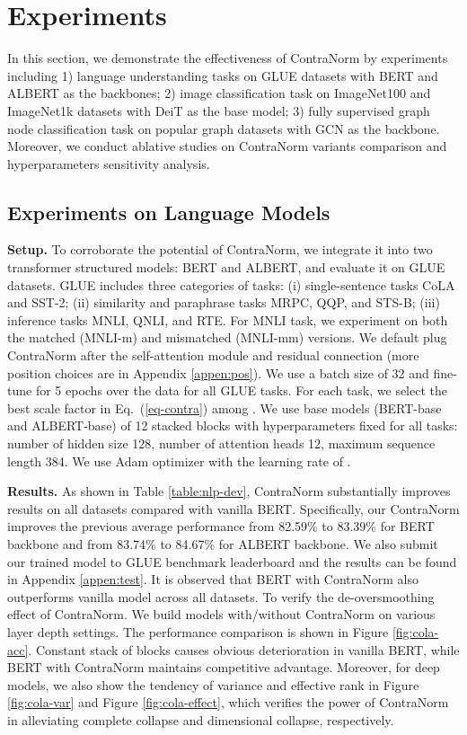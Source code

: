 \documentclass{article}
\theoremstyle{definition}
\theoremstyle{remark}
\theoremstyle{theorem}
\begin{document}
\section{Experiments}
In this section, we demonstrate the effectiveness of ContraNorm by experiments including 1) language understanding tasks on GLUE datasets with BERT and ALBERT \citep{lan2019albert} as the backbones; 2) image classification task on ImageNet100 and ImageNet1k datasets with DeiT as the base model; 3) fully supervised graph node classification task on popular graph datasets with GCN as the backbone. Moreover, we conduct ablative studies on ContraNorm variants comparison and hyperparameters sensitivity analysis.


\subsection{Experiments on Language Models} \label{sec:nlp-task}
\textbf{Setup.} 
To corroborate the potential of ContraNorm, we integrate it into two transformer structured models: BERT and ALBERT, and evaluate it on GLUE datasets. GLUE includes three categories of tasks:  (i) single-sentence tasks CoLA and SST-2; (ii) similarity and paraphrase tasks MRPC, QQP, and STS-B; (iii) inference tasks MNLI, QNLI, and RTE. For MNLI task, we experiment on both the matched (MNLI-m) and mismatched (MNLI-mm) versions. We default plug ContraNorm after the self-attention module and residual connection (more position choices are in Appendix \ref{appen:pos}). We use a batch size of 32 and fine-tune for 5 epochs over the data for all GLUE tasks. For each task, we select the best scale factor  in Eq.~(\ref{eq-contra}) among . We use base models (BERT-base and ALBERT-base) of 12 stacked blocks with hyperparameters fixed for all tasks: number of hidden size 128, number of attention heads 12, maximum sequence length 384. We use Adam \citep{kingma2014adam} optimizer with the learning rate of . 

\textbf{Results.} As shown in Table \ref{table:nlp-dev}, ContraNorm substantially improves results on all datasets compared with vanilla BERT. Specifically, our ContraNorm improves the previous average performance from 82.59\% to 83.39\% for BERT backbone and from 83.74\% to 84.67\% for ALBERT backbone. We also submit our trained model to GLUE benchmark leaderboard and the results can be found in Appendix \ref{appen:test}. It is observed that BERT with ContraNorm also outperforms vanilla model across all datasets. To verify the de-oversmoothing effect of ContraNorm. We build models with/without ContraNorm on various layer depth settings. The performance comparison is shown in Figure \ref{fig:cola-acc}. Constant stack of blocks causes obvious deterioration in vanilla BERT, while BERT with ContraNorm maintains competitive advantage. Moreover, for deep models, we also show the tendency of variance and effective rank in Figure \ref{fig:cola-var} and Figure \ref{fig:cola-effect}, which verifies the power of ContraNorm in alleviating complete collapse and dimensional collapse, respectively.
\end{document}
